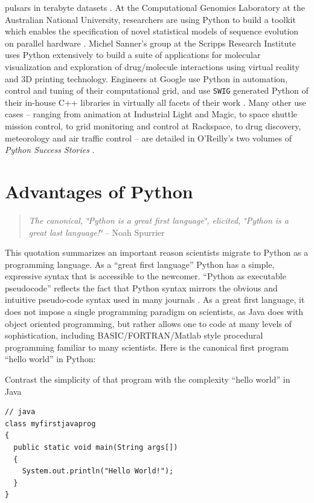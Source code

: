 pulsars in terabyte datasets \cite{Ransometal2004a,Ransom2005}. At
the Computational Genomics Laboratory at the Australian National University,
researchers are using Python to build a toolkit which enables the
specification of novel statistical models of sequence evolution on
parallel hardware \cite{Huttley2004,Butterfield2004}. Michel Sanner's
group at the Scripps Research Institute uses Python extensively to
build a suite of applications for molecular visualization and exploration
of drug/molecule interactions using virtual reality and 3D printing
technology\cite{Sanner2005a,Sanner2005b}. Engineers at Google use
Python in automation, control and tuning of their computational grid,
and use \texttt{SWIG} generated Python of their in-house C++ libraries
in virtually all facets of their work \cite{Beazley1998,Stein2005}.
Many other use cases -- ranging from animation at Industrial Light
and Magic, to space shuttle mission control, to grid monitoring and
control at Rackspace, to drug discovery, meteorology and air traffic
control -- are detailed in O'Reilly's two volumes of \emph{Python
Success Stories} \cite{PySuccess2002,PySuccess2005}.


\section{Advantages of Python}

\begin{quotation}
\textit{The canonical, \char`\"{}Python is a great first language\char`\"{},
elicited, \char`\"{}Python is a great last language!\char`\"{}} --
Noah Spurrier 
\end{quotation}
This quotation summarizes an important reason scientists migrate to
Python as a programming language. As a {}``great first language''
Python has a simple, expressive syntax that is accessible to the newcomer.
{}``Python as executable pseudocode'' reflects the fact that Python
syntax mirrors the obvious and intuitive pseudo-code syntax used in
many journals \cite{Strous2001}. As a great first language, it does
not impose a single programming paradigm on scientists, as Java does
with object oriented programming, but rather allows one to code at
many levels of sophistication, including BASIC/FORTRAN/Matlab style
procedural programming familiar to many scientists. Here is the canonical
first program {}``hello world'' in Python:

  Contrast the simplicity of that program with the complexity {}``hello
world'' in Java  {\small \begin{verbatim}
// java 
class myfirstjavaprog
{  
  public static void main(String args[])
  {
    System.out.println("Hello World!");
  }
} 
\end{verbatim}} 

